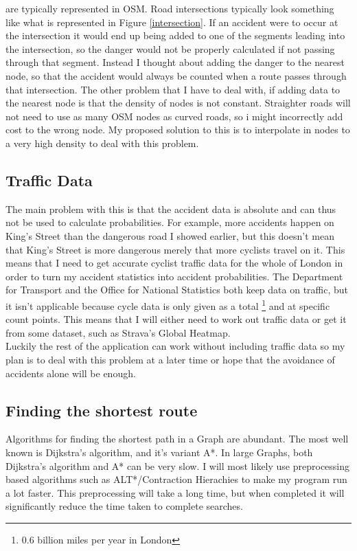 \documentclass[11pt,twoside,a4paper]{report}
\begin{document}
are typically represented in OSM. Road intersections typically look something like what is represented in Figure \ref{intersection}. If an accident were to occur at the intersection it would end up being added to one of the segments leading into the intersection, so the danger would not be properly calculated if not passing through that segment. Instead I thought about adding the danger to the nearest node, so that the accident would always be counted when a route passes through that intersection.
The other problem that I have to deal with, if adding data to the nearest node is that the density of nodes is not constant. Straighter roads will not need to use as many OSM nodes as curved roads, so i might incorrectly add cost to the wrong node. My proposed solution to this is to interpolate in nodes to a very high density to deal with this problem.
\subsection{Traffic Data}
The main problem with this is that the accident data is absolute and can thus not be used to calculate probabilities. For example, more accidents happen on King's Street than the dangerous road I showed earlier, but this doesn't mean that King's Street is more dangerous merely that more cyclists travel on it. This means that I need to get accurate cyclist traffic data for the whole of London in order to turn my accident statistics into accident probabilities.
The Department for Transport and the Office for National Statistics both keep data on traffic, but it isn't applicable because cycle data is only given as a total \footnote{0.6 billion miles per year in London} and at specific count points.
This means that I will either need to work out traffic data or get it from some dataset, such as Strava's Global Heatmap. \\
Luckily the rest of the application can work without including traffic data so my plan is to deal with this problem at a later time or hope that the avoidance of accidents alone will be enough.  
\subsection{Finding the shortest route}
Algorithms for finding the shortest path in a Graph are abundant. The most well known is Dijkstra's algorithm, and it's variant A*. In large Graphs, both Dijkstra's algorithm and A* can be very slow. I will most likely use preprocessing based algorithms such as ALT*/Contraction Hierachies to make my program run a lot faster.
This preprocessing will take a long time, but when completed it will significantly reduce the time taken to complete searches. 
\end{document}
